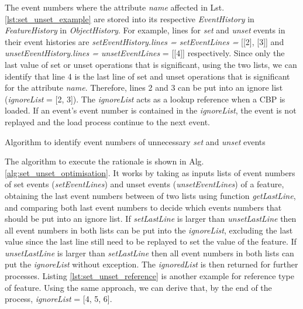 \documentclass{llncs}
\begin{document}
The event numbers where the attribute \emph{name} affected in Lst. \ref{lst:set_unset_example} are stored into its respective \emph{EventHistory} in \emph{FeatureHistory} in \emph{ObjectHistory}. For example, lines for \emph{set} and \emph{unset} events in their event histories are \emph{setEventHistory.lines = setEventLines =} [[2], [3]] and \emph{unsetEventHistory.lines = unsetEventLines} = [[4]] respectively. Since only the last value of set or unset operations that is significant, using the two lists, we can identify that line 4 is the last line of set and unset operations that is significant for the attribute \emph{name}. Therefore, lines 2 and 3 can be put into an ignore list (\emph{ignoreList} = [2, 3]). The \emph{ignoreList} acts as a lookup reference when a CBP is loaded. If an event's event number is contained in the \emph{ignoreList}, the event is not replayed and the load process continue to the next event.

\begin{algorithm}[H]
\begin{small}
\end{small}
\caption{Algorithm to identify event numbers of unnecessary \emph{set} and \emph{unset} events}
\label{alg:set_unset_optimisation}
\end{algorithm}

The algorithm to execute the rationale is shown in Alg. \ref{alg:set_unset_optimisation}. It works by taking as inputs lists of event numbers of set events (\emph{setEventLines}) and unset events (\emph{unsetEventLines}) of a feature, obtaining the last event numbers between of two lists using function \emph{getLastLine}, and comparing both last event numbers to decide which events numbers that should be put into an ignore list. If \emph{setLastLine} is larger than \emph{unsetLastLine} then all event numbers in both lists can be put into the \emph{ignoreList}, excluding the last value since the last line still need to be replayed to set the value of the feature. If \emph{unsetLastLine} is larger than \emph{setLastLine} then all event numbers in both lists can put the \emph{ignoreList} without exception. The \emph{ignoredList} is then returned for further processes. Listing \ref{lst:set_unset_reference} is another example for reference type of feature. Using the same approach, we can derive that, by the end of the process, \emph{ignoreList} = [4, 5, 6].   
\end{document}
